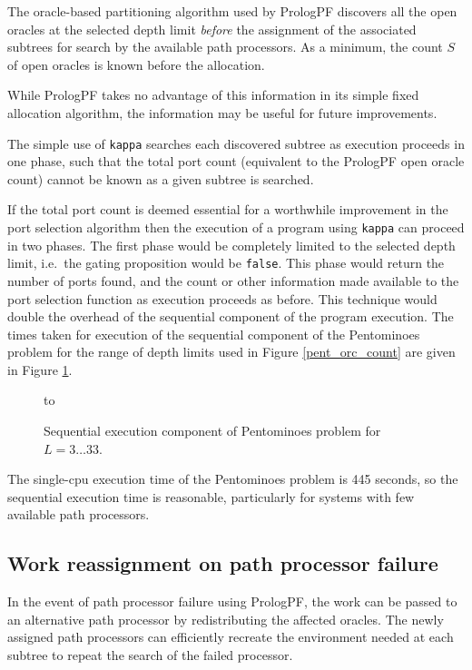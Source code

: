 The oracle-based partitioning algorithm used by PrologPF discovers all the open
oracles at the selected depth limit \textit{before} the assignment of the associated
subtrees for search by the available path processors.  As a minimum, the count
$S$ of open oracles is known before the allocation.

While PrologPF takes no advantage of this information in its simple fixed allocation
algorithm, the information may be useful for future improvements.

The simple use of \texttt{kappa} searches each discovered subtree as execution proceeds
in one phase, such that the total port count (equivalent to the PrologPF open oracle
count) cannot be known as a given subtree is searched.

If the total port count is deemed essential for a worthwhile improvement in the
port selection algorithm then the execution of a program using \texttt{kappa} can
proceed in two phases.  The first phase would be completely limited to the
selected depth limit, i.e.\ the gating proposition would be \texttt{false}.  This
phase would return the number of ports found, and the count or other information made
available to the port selection function as execution proceeds as before.  This
technique would double the overhead of the sequential component of the program
execution.  The times taken for execution of the sequential component of the
Pentominoes problem for the range of depth limits used in Figure \ref{pent_orc_count}
are given in Figure \ref{pent_bf_times}.

\begin{figure}[htbp]
\vspace{5mm} \hbox to 
\caption{Sequential execution component of Pentominoes problem for $L=3\ldots 33$.}
\vspace{5mm}
\label{pent_bf_times}
\end{figure}

The single-cpu execution time of the Pentominoes problem is 445 seconds, so the
sequential execution time is reasonable, particularly for systems with few available
path processors.

\subsection{Work reassignment on path processor failure}

In the event of path processor failure using PrologPF,
the work can be passed to an alternative
path processor by redistributing the affected oracles.  The newly assigned path
processors can efficiently recreate the environment needed at each subtree to
repeat the search of the failed processor.

